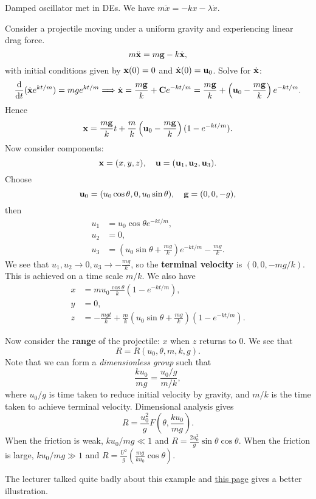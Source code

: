 \begin{example}
    Damped oscillator met in DEs. We have $ m \ddot{x} = -kx - \lambda \dot{x} $.
\end{example}
\begin{example}
    Consider a projectile moving under a uniform gravity and experiencing linear drag force.
    \[
        m \ddot{{\bf x}} = m{\bf g} -k \dot{{\bf x}},
    \]
    with initial conditions given by $ {\bf x}(0) = 0 $ and $ \dot{{\bf x}}(0)={\bf u}_0 $. Solve for $ \dot{{\bf x}} $:
    \[
        \frac{\mathrm{d}}{\mathrm{d}t} (\dot{{\bf x}} e^{kt/m})=mge^{kt/m} \Longrightarrow \dot{{\bf x}} = \frac{m{\bf g}}{k}+{\bf C} e^{-kt/m} = \frac{m{\bf g}}{k}+\left( {\bf u}_0-\frac{m{\bf g}}{k} \right)e^{-kt/m}.
    \]
    Hence 
    \[
        {\bf x} = \frac{m{\bf g}}{k}t+\frac{m}{k}\left( {\bf u}_0-\frac{m{\bf g}}{k} \right)(1-e^{-kt/m}).
    \]
    Now consider components:
    \[
        {\bf x}=(x,y,z),\quad {\bf u}= ({\bf u}_1,{\bf u}_2,{\bf u}_3).
    \]
    Choose
    \[
        {\bf u}_0 = (u_0 \cos \theta,0,u_0 \sin \theta),\quad {\bf g} = (0,0,-g),
    \]
    then
    \begin{align*}
        u_1 &= u_0 \cos \theta e^{-kt/m},\\ 
        u_2 &= 0,\\
        u_3 &= \left( u_0\sin \theta+\frac{mg}{k} \right)e^{-kt/m}-\frac{mg}{k}.
    \end{align*}
    We see that $ u_1,u_2\to 0,u_3\to -\frac{mg}{k} $, so the \textbf{terminal velocity} is $ (0,0,-mg/k) $. This is achieved on a time scale $ m/k $. We also have 
    \begin{align*}
        x&= m u_0\frac{\cos \theta}{k}(1-e^{-kt/m}),\\ 
        y&= 0,\\ 
        z&= -\frac{mgt}{k}+\frac{m}{k}\left( u_0 \sin \theta+\frac{mg}{k} \right)(1-e^{-kt/m}).
    \end{align*}

    Now consider the \textbf{range} of the projectile: $x$ when $z$ returns to 0. We see that 
    \[
        R = R(u_0,\theta,m,k,g).
    \]
    Note that we can form a \textit{dimensionless group} such that 
    \[
        \frac{ku_0}{mg} = \frac{u_0/g}{m/k},
    \]
    where $u_0/g$ is time taken to reduce initial velocity by gravity, and $m/k$ is the time taken to achieve terminal velocity. Dimensional analysis gives 
    \[
        R = \frac{u_0^2}{g}F\left( \theta,\frac{ku_0}{mg} \right).
    \] 
    When the friction is weak, $ ku_0/mg\ll 1 $ and $ R = \frac{2u_0^2}{g}\sin \theta \cos \theta  $. When the friction is large, $ ku_0/mg\gg 1 $ and $ R=\frac{U^2}{g}\left( \frac{mg}{ku_0}\cos \theta \right) $.
\end{example}
The lecturer talked quite badly about this example and \href{http://www.damtp.cam.ac.uk/user/tong/relativity/two.pdf\#page=27}{this page} gives a better illustration.